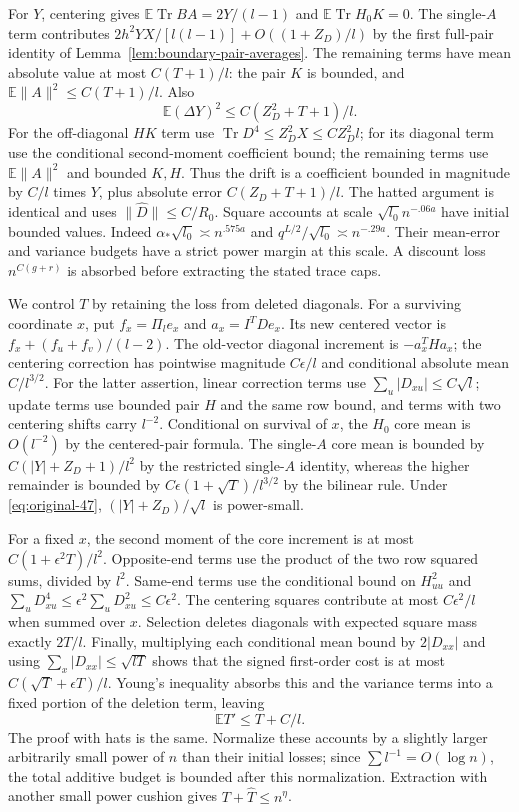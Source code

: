 For $Y$, centering gives
$\mathbb E\operatorname{Tr}BA=2Y/(l-1)$ and
$\mathbb E\operatorname{Tr}H_0K=0$.
The single-$A$ term contributes
$2h^2YX/[l(l-1)]+O((1+Z_D)/l)$ by the first full-pair identity
of Lemma~\ref{lem:boundary-pair-averages}.
The remaining terms have mean absolute value at most $C(T+1)/l$:
the pair $K$ is bounded, and
$\mathbb E\|A\|^2\le C(T+1)/l$.
Also
\[
 \mathbb E(\Delta Y)^2\le C(Z_D^2+T+1)/l.
\]
For the off-diagonal $HK$ term use
$\operatorname{Tr}D^4\le Z_D^2X\le CZ_D^2l$; for its diagonal
term use the conditional second-moment coefficient bound; the
remaining terms use $\mathbb E\|A\|^2$ and bounded $K,H$.
Thus the drift is a coefficient bounded in magnitude by $C/l$
times $Y$, plus absolute error $C(Z_D+T+1)/l$.
The hatted argument is identical and uses $\|\widehat D\|\le C/R_0$.
Square accounts at scale $\sqrt{l_0}n^{-.06a}$ have initial bounded
values.  Indeed $\alpha_*\sqrt{l_0}\asymp n^{.575a}$ and
$q^{L/2}/\sqrt{l_0}\asymp n^{-.29a}$.
Their mean-error and variance budgets have a strict power margin at
this scale.  A discount loss $n^{C(g+r)}$ is absorbed before
extracting the stated trace caps.

We control $T$ by retaining the loss from deleted diagonals.  For a surviving coordinate $x$, put
$f_x=\Pi_le_x$ and $a_x=I^TDe_x$.
Its new centered vector is
$f_x+(f_u+f_v)/(l-2)$.  The old-vector diagonal increment is
$-a_x^THa_x$; the centering correction has pointwise magnitude
$C\epsilon/l$ and conditional absolute mean $C/l^{3/2}$.
For the latter assertion, linear correction terms use
$\sum_u|D_{xu}|\le C\sqrt l$; update terms use bounded pair $H$
and the same row bound, and terms with two centering shifts carry
$l^{-2}$.  Conditional on survival of $x$, the $H_0$ core mean is
$O(l^{-2})$ by the centered-pair formula.  The single-$A$ core mean
is bounded by
$C(|Y|+Z_D+1)/l^2$ by the restricted single-$A$ identity, whereas
the higher remainder is bounded by
$C\epsilon(1+\sqrt T)/l^{3/2}$ by the bilinear rule.
Under \eqref{eq:original-47},
$(|Y|+Z_D)/\sqrt l$ is power-small.

For a fixed $x$, the second moment of the core increment is at most
$C(1+\epsilon^2T)/l^2$.  Opposite-end terms use the product of the
two row squared sums, divided by $l^2$.  Same-end terms use the
conditional bound on $H_{uu}^2$ and
$\sum_uD_{xu}^4\le\epsilon^2\sum_uD_{xu}^2\le C\epsilon^2$.
The centering squares contribute at most $C\epsilon^2/l$ when
summed over $x$.  Selection deletes diagonals with expected square
mass exactly $2T/l$.  Finally, multiplying each conditional mean
bound by $2|D_{xx}|$ and using
$\sum_x|D_{xx}|\le\sqrt{lT}$ shows that the signed first-order
cost is at most $C(\sqrt T+\epsilon T)/l$.
Young's inequality absorbs this and the variance terms into a fixed
portion of the deletion term, leaving
\begin{equation}
 \mathbb ET'\le T+C/l.
 \label{eq:original-49}
\end{equation}
The proof with hats is the same.  Normalize these accounts by a
slightly larger arbitrarily small power of $n$ than their initial
losses; since $\sum l^{-1}=O(\log n)$, the total additive budget is
bounded after this normalization.  Extraction with another small
power cushion gives $T+\widehat T\le n^\eta$.


